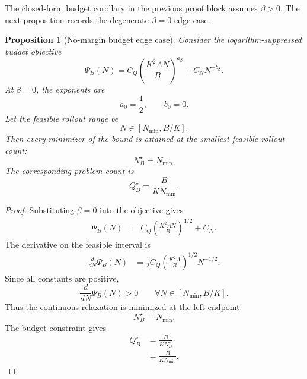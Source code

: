 \documentclass{article} %
\newtheorem{proposition}[theorem]{Proposition}
\begin{document}
The closed-form budget corollary in the previous proof block assumes \(\beta>0\).  The next proposition records the degenerate \(\beta=0\) edge case.

\begin{proposition}[No-margin budget edge case]
\label{prop:6}
Consider the logarithm-suppressed budget objective
\begin{equation}
\label{eq:app4-budget-objective}
\Psi_B(N)
=
C_Q
\left(\frac{K^2AN}{B}\right)^{a_\beta}
+
C_NN^{-b_\beta}.
\end{equation}
At \(\beta=0\), the exponents are
\begin{equation}
\label{eq:app4-beta0-exponents}
a_0=\frac{1}{2},
\qquad
b_0=0.
\end{equation}
Let the feasible rollout range be
\begin{equation}
\label{eq:app4-budget-domain}
N\in[N_{\min},B/K].
\end{equation}
Then every minimizer of the bound is attained at the smallest feasible rollout count:
\begin{equation}
\label{eq:app4-budget-beta0-N}
N_B^\star
=
N_{\min}.
\end{equation}
The corresponding problem count is
\begin{equation}
\label{eq:app4-budget-beta0-Q}
Q_B^\star
=
\frac{B}{KN_{\min}}.
\end{equation}
\end{proposition}

\begin{proof}
Substituting \(\beta=0\) into the objective gives
\begin{align}
\Psi_B(N)
&=
C_Q
\left(\frac{K^2AN}{B}\right)^{1/2}
+
C_N.
\label{eq:app4-budget-beta0-proof-a}
\end{align}
The derivative on the feasible interval is
\begin{align}
\frac{d}{dN}\Psi_B(N)
&=
\frac{1}{2}
C_Q
\left(\frac{K^2A}{B}\right)^{1/2}
N^{-1/2}.
\label{eq:app4-budget-beta0-proof-b}
\end{align}
Since all constants are positive,
\begin{equation}
\label{eq:app4-budget-beta0-proof-c}
\frac{d}{dN}\Psi_B(N)>0
\qquad
\forall N\in[N_{\min},B/K].
\end{equation}
Thus the continuous relaxation is minimized at the left endpoint:
\begin{equation}
\label{eq:app4-budget-beta0-proof-d}
N_B^\star=N_{\min}.
\end{equation}
The budget constraint gives
\begin{align}
Q_B^\star
&=
\frac{B}{K N_B^\star}
\label{eq:app4-budget-beta0-proof-e}
\\
&=
\frac{B}{K N_{\min}}.
\label{eq:app4-budget-beta0-proof-f}
\end{align}
\end{proof}
\end{document}

